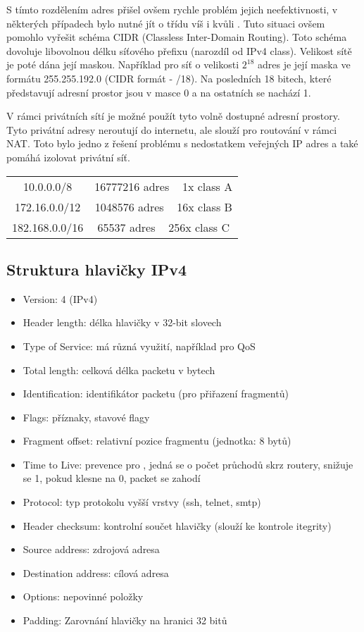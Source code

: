 \documentclass{szzclass}
\begin{document}
S tímto rozdělením adres přišel ovšem rychle problém jejich neefektivnosti, v některých případech bylo nutné jít o třídu víš i kvůli .
Tuto situaci ovšem pomohlo vyřešit schéma CIDR (Classless Inter-Domain Routing). Toto schéma dovoluje libovolnou délku síťového přefixu (narozdíl od IPv4 class).
Velikost sítě je poté dána její maskou. Například pro síť o velikosti $2^18$ adres je její maska ve formátu 255.255.192.0 (CIDR formát - /18). Na posledních 18 bitech, které představují adresní prostor
jsou v masce 0 a na ostatních se nachází 1.

V rámci privátních sítí je možné použít tyto volně dostupné adresní prostory. Tyto privátní adresy neroutují do internetu, ale slouží pro routování v rámci NAT. Toto
bylo jedno z řešení problému s nedostatkem veřejných IP adres a také pomáhá izolovat privátní síť.

\begin{tabular}{c|c}
    10.0.0.0/8 & 16777216 adres ~ 1x class A \\
    172.16.0.0/12 & 1048576 adres ~ 16x class B \\
    182.168.0.0/16 & 65537 adres ~ 256x class C \\
\end{tabular}

\newpage

\subsection{Struktura hlavičky IPv4}

\begin{itemize}
    \item Version: 4 (IPv4)
    \item Header length: délka hlavičky v 32-bit slovech
    \item Type of Service: má různá využití, například pro QoS
    \item Total length: celková délka packetu v bytech
    \item Identification: identifikátor packetu (pro přiřazení fragmentů)
    \item Flags: příznaky, stavové flagy
    \item Fragment offset: relativní pozice fragmentu (jednotka: 8 bytů)
    \item Time to Live: prevence pro , jedná se o počet průchodů skrz routery, snižuje se 1, pokud klesne na 0, packet se zahodí
    \item Protocol: typ protokolu vyšší vrstvy (ssh, telnet, smtp)
    \item Header checksum: kontrolní součet hlavičky (slouží ke kontrole itegrity)
    \item Source address: zdrojová adresa
    \item Destination address: cílová adresa
    \item Options: nepovinné položky
    \item Padding: Zarovnání hlavičky na hranici 32 bitů
\end{itemize}
\end{document}
